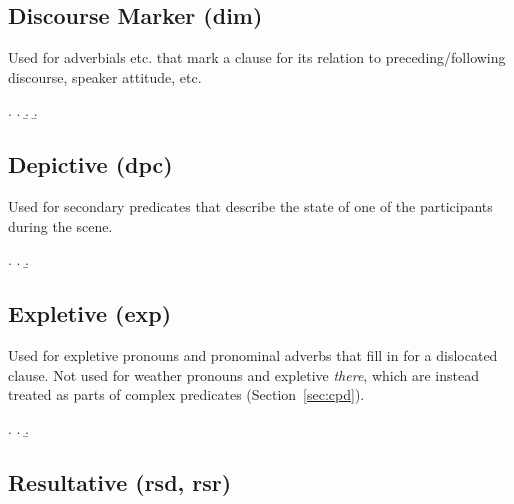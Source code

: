 \documentclass[a4paper]{article}
\begin{document}

\clearpage
\subsection{Discourse Marker (\textsf{dim})}
\label{sec:dim}

Used for adverbials etc. that mark a clause for its relation to preceding/following discourse, speaker attitude, etc.

\ex.
\a. 
\b. 
\b. 


\clearpage
\subsection{Depictive (\textsf{dpc})}
\label{sec:dpc}

Used for secondary predicates that describe the state of one of the participants during the scene.

\ex.
\a. 
\b. 


\clearpage
\subsection{Expletive (\textsf{exp})}
\label{sec:exp}

Used for expletive pronouns and pronominal adverbs that fill in for a
dislocated clause. Not used for weather pronouns and expletive \emph{there},
which are instead treated as parts of complex predicates
(Section~\ref{sec:cpd}).

\ex.
\a. 
\b. 


\clearpage
\subsection{Resultative (\textsf{rsd}, \textsf{rsr})}
\label{sec:rsd}\label{sec:rsr}
\end{document}
